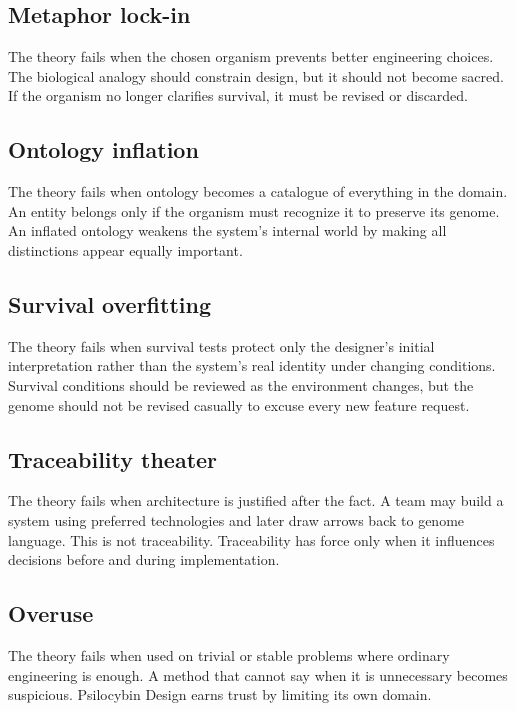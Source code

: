 \documentclass[11pt]{article}
\begin{document}
\subsection{Metaphor lock-in}

The theory fails when the chosen organism prevents better engineering choices. The biological analogy should constrain design, but it should not become sacred. If the organism no longer clarifies survival, it must be revised or discarded.

\subsection{Ontology inflation}

The theory fails when ontology becomes a catalogue of everything in the domain. An entity belongs only if the organism must recognize it to preserve its genome. An inflated ontology weakens the system's internal world by making all distinctions appear equally important.

\subsection{Survival overfitting}

The theory fails when survival tests protect only the designer's initial interpretation rather than the system's real identity under changing conditions. Survival conditions should be reviewed as the environment changes, but the genome should not be revised casually to excuse every new feature request.

\subsection{Traceability theater}

The theory fails when architecture is justified after the fact. A team may build a system using preferred technologies and later draw arrows back to genome language. This is not traceability. Traceability has force only when it influences decisions before and during implementation.

\subsection{Overuse}

The theory fails when used on trivial or stable problems where ordinary engineering is enough. A method that cannot say when it is unnecessary becomes suspicious. Psilocybin Design earns trust by limiting its own domain.
\end{document}
